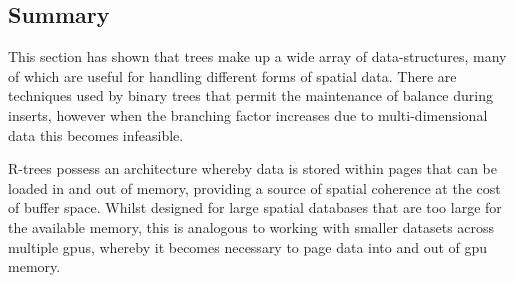   \subsection{Summary}
    This section has shown that trees make up a wide array of data-structures, many of which are useful for handling different forms of spatial data. There are techniques used by binary trees that permit the maintenance of balance during inserts, however when the branching factor increases due to multi-dimensional data this becomes infeasible.
    
    R-trees possess an architecture whereby data is stored within pages that can be loaded in and out of memory, providing a source of spatial coherence at the cost of buffer space. Whilst designed for large spatial databases that are too large for the available memory, this is analogous to working with smaller datasets across multiple \glspl{gpu}, whereby it becomes necessary to page data into and out of \gls{gpu} memory.
    